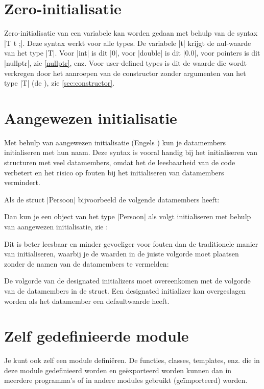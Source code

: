 \begin{cpplstShortInline}
\section{Zero-initialisatie}
\label{sec:zeroinitialisatie}
Zero-initialisatie van een variabele kan worden gedaan met behulp van de syntax |T t {};|. Deze syntax werkt voor alle types. De variabele |t| krijgt de nul-waarde van het type |T|. Voor |int| is dit |0|, voor |double| is dit |0.0|, voor pointers is dit |nullptr|, zie \cref{nullptr}, enz. Voor user-defined types is dit de waarde die wordt verkregen door het aanroepen van de constructor zonder argumenten van het type |T| (de ), zie \cref{sec:constructor}.

\section{Aangewezen initialisatie}
\label{sec:designated_initializers}
Met behulp van aangewezen initialisatie (Engels ) kun je datamembers initialiseren met hun naam.
Deze syntax is vooral handig bij het initialiseren van structuren met veel datamembers, omdat het de leesbaarheid van de code verbetert en het risico op fouten bij het initialiseren van datamembers vermindert.

Als de struct |Persoon| bijvoorbeeld de volgende datamembers heeft:

Dan kun je een object van het type |Persoon| als volgt initialiseren met behulp van aangewezen initialisatie, zie :

Dit is beter leesbaar en minder gevoeliger voor fouten dan de traditionele manier van initialiseren, waarbij je de waarden in de juiste volgorde moet plaatsen zonder de namen van de datamembers te vermelden:

De volgorde van de designated initializers moet overeenkomen met de volgorde van de datamembers in de struct.
Een designated initializer kan overgeslagen worden als het datamember een defaultwaarde heeft.

\section{Zelf gedefinieerde module}
\label{sec:zelfgedefinieerdemodule}
Je kunt ook zelf een module definiëren.
De functies, classes, templates, enz. die in deze module gedefinieerd worden en geëxporteerd worden kunnen dan in meerdere programma's of in andere modules gebruikt (geïmporteerd) worden.


\end{cpplstShortInline}
